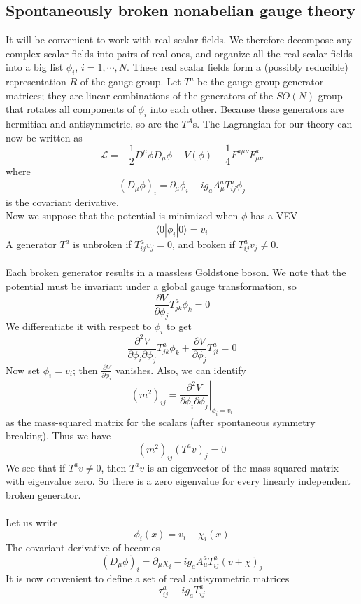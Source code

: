 \subsection{Spontaneously broken nonabelian gauge theory}
It will be convenient to work with real scalar fields. We
therefore decompose any complex scalar fields into pairs of real ones, and organize all the real scalar fields into a big list $\phi_i$, $i = 1,\cdots,N$. 
These real scalar fields form a (possibly reducible) representation $R$ of the gauge group. Let $T^a$ be the gauge-group generator matrices; they are linear combinations of the generators of the $SO(N)$ group that rotates all components of $\phi_i$ into each other. Because these generators are hermitian and antisymmetric, so are the  $T^A$s. The Lagrangian for our theory can now be written as
\[\mathcal{L} = -\frac{1}{2}D^{\mu}\phi D_{\mu}\phi - V(\phi) - \frac{1}{4}F^{a\mu\nu}F^a_{\mu\nu}\]
where
\[(D_{\mu}\phi)_i = \partial_{\mu}\phi_i - ig_aA^a_{\mu}T^a_{ij}\phi_j\]
is the covariant derivative.
\\
Now we suppose that the potential is minimized when $\phi$ has a VEV
\[\langle 0 | \phi_i | 0 \rangle = v_i\]
A generator $T^a$ is unbroken if $T^a_{ij}v_j = 0$, and broken if $T^a_{ij}v_j \neq 0$.
\\ \\
Each broken generator results in a massless Goldstone boson. We note that the potential must be invariant under a global gauge transformation, so
\[\frac{\partial V}{\partial \phi_j} T^a_{jk}\phi_k = 0\]
We differentiate it with respect to $\phi_i$ to get
\[\frac{\partial^2 V}{\partial \phi_i \partial \phi_j} T^a_{jk}\phi_k + \frac{\partial V}{\partial \phi_j} T^a_{ji} = 0 \]
Now set $\phi_i = v_i$; then $\frac{\partial V}{\partial \phi_i}$ vanishes. Also, we can identify
\[(m^2)_{ij} = \left. \frac{\partial^2 V}{\partial \phi_i \partial \phi_j} \right|_{\phi_i = v_i}\]
as the mass-squared matrix for the scalars (after spontaneous symmetry breaking). Thus we have
\[(m^2)_{ij} (T^av)_j = 0\]
We see that if $T^av \neq 0$, then $T^av$ is an eigenvector of the mass-squared matrix with eigenvalue zero. So there is a zero eigenvalue for every linearly independent broken generator.
\\ \\
Let us write
\[\phi_i(x) = v_i + \chi_i(x)\]
The covariant derivative of becomes
\[(D_{\mu}\phi)_i = \partial_{\mu}\chi_i - ig_aA^a_{\mu}T^a_{ij}(v+\chi)_j\]
It is now convenient to define a set of real antisymmetric matrices
\[\tau^a_{ij} \equiv ig_aT^a_{ij}\]
